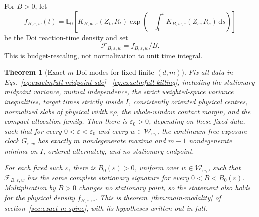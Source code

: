 \documentclass{iopjournal}
\newcommand{\dd}{\mathrm d}
\theoremstyle{plain}
\newtheorem{theorem}{Theorem}
\theoremstyle{definition}
\begin{document}
For \(B>0\), let
\begin{equation}
 f_{B,\varepsilon,w}(t)
 =\mathbb E_0\!\left[
 K_{B,w,\varepsilon}(Z_t,R_t)
 \exp\!\left(-\int_0^tK_{B,w,\varepsilon}(Z_s,R_s)\,\dd s\right)
 \right]
 \label{eq:exactmfull-reaction-density}
\end{equation}
be the Doi reaction-time density and set
\begin{equation}
 \mathcal F_{B,\varepsilon,w}=f_{B,\varepsilon,w}/B.
 \label{eq:exactmfull-rescaled-density}
\end{equation}
This is budget-rescaling, not normalization to unit time integral.

\begin{theorem}[Exact \(m\) Doi modes for fixed finite \((d,m)\)]
\label{thm:exactmfull-doi}
Fix all data in Eqs.~\eqref{eq:exactmfull-midpoint-sde}--
\eqref{eq:exactmfull-killing}, including the stationary midpoint variance,
mutual independence, the strict weighted-space variance inequalities, target
times strictly inside \(I\), consistently oriented physical centres,
normalized slabs of physical width \(\varepsilon\rho\), the whole-window
contact margin, and the compact allocation family.  Then there is
\(\varepsilon_0>0\), depending on these fixed data, such that for every
\(0<\varepsilon<\varepsilon_0\) and every
\(w\in\mathcal W_{w_*}\), the continuum free-exposure clock
\(G_{\varepsilon,w}\) has exactly \(m\) nondegenerate maxima and \(m-1\)
nondegenerate minima on \(I\), ordered alternately, and no stationary
endpoint.

For each fixed such \(\varepsilon\), there is
\(B_0(\varepsilon)>0\), uniform over \(w\in\mathcal W_{w_*}\), such that
\(\mathcal F_{B,\varepsilon,w}\) has the same complete stationary signature
for every \(0<B<B_0(\varepsilon)\).  Multiplication by \(B>0\) changes no
stationary point, so the statement also holds for the physical density
\(f_{B,\varepsilon,w}\).  This is theorem~\ref{thm:main-modality} of
section~\ref{sec:exact-m-spine}, with its hypotheses written out in full.
\end{theorem}
\end{document}
